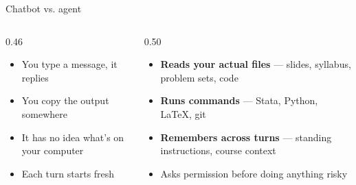 \documentclass[aspectratio=169, 10pt]{beamer}
\begin{document}
\begin{frame}{Chatbot vs. agent}
\vskip2pt
\begin{columns}[T]
\begin{column}{0.46\textwidth}
\begin{tcolorbox}[dontbox, title={\faComments\quad A chatbot}]
\small
\begin{itemize}\setlength{\itemsep}{2pt}
  \item You type a message, it replies
  \item You copy the output somewhere
  \item It has no idea what's on your computer
  \item Each turn starts fresh
\end{itemize}
\end{tcolorbox}
\end{column}
\begin{column}{0.50\textwidth}
\begin{tcolorbox}[dobox, title={\faRobot\quad An agent}]
\small
\begin{itemize}\setlength{\itemsep}{2pt}
  \item \textbf{Reads your actual files} --- slides, syllabus, problem sets, code
  \item \textbf{Runs commands} --- Stata, Python, LaTeX, git
  \item \textbf{Remembers across turns} --- standing instructions, course context
  \item Asks permission before doing anything risky
\end{itemize}
\end{tcolorbox}
\end{column}
\end{columns}
\vskip4pt
\end{frame}
\end{document}
